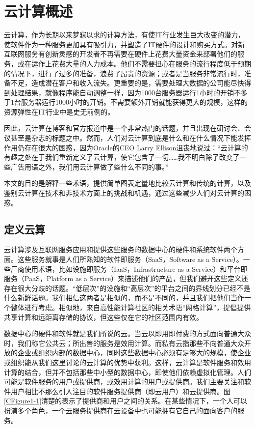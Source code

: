 \chapter{云计算概述}

云计算，作为长期以来梦寐以求的计算方法，有使IT行业发生巨大改变的潜力，使软件作为一种服务更加具有吸引力，并塑造了IT硬件的设计和购买方式。对新互联网服务有创新灵感的开发者不再需要在硬件上花费大量资金来部署他们的服务，或在运作上花费大量的人力成本。他们不需要担心在服务的流行程度低于预期的情况下，进行了过多的准备，浪费了昂贵的资源；或者是当服务非常流行时，准备不足，造成潜在客户和收入流失。更重要的是，需要处理大数据的公司能尽快得到处理结果，就像程序能自动调整一样，因为1000台服务器运行1小时的开销不多于1台服务器运行1000小时的开销。不需要额外开销就能获得更大的规模，这样的资源弹性在IT行业中是史无前例的。

因此，云计算在博客和官方报道中是一个非常热门的话题，并且出现在研讨会、会议甚至是杂志的标题之中。然而，人们对云计算到底是什么和在什么情况下能发挥作用仍存在很大的困惑，因为Oracle的CEO Larry Ellison沮丧地说过：“云计算的有趣之处在于我们重新定义了云计算，使它包含了一切……我不明白除了改变了一些广告用语之外，我们用云计算做了些什么不同的事。”

本文的目的是解释一些术语，提供简单图表定量地比较云计算和传统的计算，以及鉴别云计算在技术和非技术方面上的挑战和机遇，通过这些减少人们对云计算的困惑。

\section{定义云算}

云计算涉及互联网服务应用和提供这些服务的数据中心的硬件和系统软件两个方面。这些服务就事是人们所熟知的软件即服务（SaaS，Software as a Service）。一些厂商使用术语，比如设施即服务（IaaS，Infrastructure as a Service）和平台即服务（PaaS，Platform as a Service）来描述他们的产品，但我们避开这些定义还存在很大分歧的话题。“低层次”的设施和“高层次”的平台之间的界线划分已经不是什么新鲜话题。我们相信这两者是相似的，而不是不同的，并且我们把他们当作一个整体进行考虑。相似地，来自高性能计算社区的相关术语“网格计算”，提倡提供共享计算和远距离存储的协议，但这些仅在它的社区范围内有效。

数据中心的硬件和软件就是我们所说的云。当云以即用即付费的方式面向普通大众时，我们称它公共云；所出售的服务是效用计算。而私有云指那些不向普通大众开放的企业或组织内部的数据中心，同时这些数据中心必须有足够大的规模，使企业或组织能从我们这里讨论的云计算的优势中获利。这样，云计算是软件服务和效用计算的结合，但并不包括那些中小型的数据中心，即使他们依赖虚拟化管理。人们可能是软件服务的用户或提供商，或效用计算的用户或提供商。我们主要关注和软件用户相比不那么引人注目的软件服务提供商（即云用户）和云提供商。图\ref{CFigure1-1}清楚的表示了提供商和用户之间的关系。在某些情况下，一个人可以扮演多个角色，一个云服务提供商在云设备中也可能拥有它自己的面向客户的服务。

